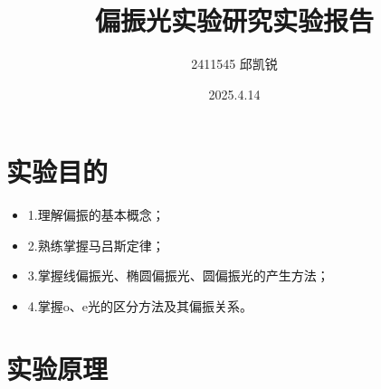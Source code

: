 \documentclass{article}
\title{偏振光实验研究实验报告}
\author{2411545 邱凯锐}
\date{2025.4.14}
\begin{document}
\maketitle
\section{实验目的}
\begin{itemize}
    \item 1.理解偏振的基本概念；
    \item 2.熟练掌握马吕斯定律；
    \item 3.掌握线偏振光、椭圆偏振光、圆偏振光的产生方法；
    \item 4.掌握o、e光的区分方法及其偏振关系。
\end{itemize}
\section{实验原理}
\end{document}
